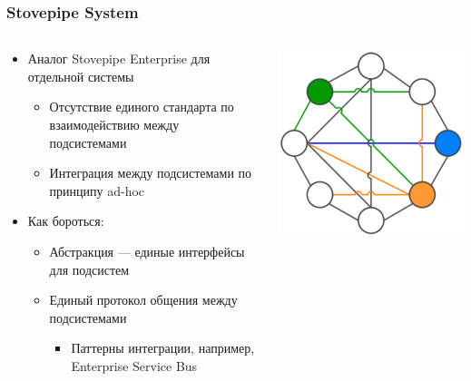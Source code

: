 \documentclass[xetex,mathserif,serif]{beamer}
\begin{document}
    \begin{frame}
        \frametitle{Stovepipe System}
        \begin{columns}
            \begin{column}{0.7\textwidth}
                \begin{itemize}
                    \item Аналог Stovepipe Enterprise для отдельной системы
                    \begin{itemize}
                        \item Отсутствие единого стандарта по взаимодействию между подсистемами
                        \item Интеграция между подсистемами по принципу ad-hoc
                    \end{itemize}
                    \item Как бороться:
                    \begin{itemize}
                        \item Абстракция --- единые интерфейсы для подсистем
                        \item Единый протокол общения между подсистемами
                        \begin{itemize}
                            \item Паттерны интеграции, например, Enterprise Service Bus
                        \end{itemize}
                    \end{itemize}
                \end{itemize}
            \end{column}
            \begin{column}{0.3\textwidth}
                \begin{center}
                    \includegraphics[width=\textwidth]{stovepipeSystem.png}

\end{center}
\end{column}
\end{columns}
\end{frame}
\end{document}
